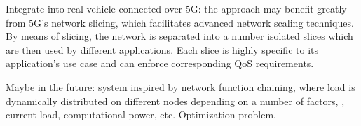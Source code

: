 Integrate into real vehicle connected over 5G: the approach may benefit greatly from 5G's network slicing, which facilitates advanced network scaling techniques. By means of slicing, the network is separated into a number isolated slices which are then used by different applications. Each slice is highly specific to its application's use case and can enforce corresponding QoS requirements.

Maybe in the future: system inspired by network function chaining, where load is dynamically distributed on different nodes depending on a number of factors, \eg , current load, computational power, etc. Optimization problem.